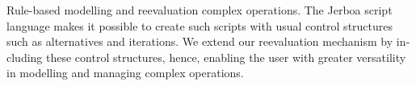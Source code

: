 \begin{otherlanguage}{english}
\begin{resume}{Rule-based modelling and reevaluation}
	  complex operations. The Jerboa script language makes it possible to create
	  such scripts with usual control structures such as alternatives and
	  iterations. We extend our reevaluation mechanism by including these
	  control structures, hence, enabling the user with greater versatility in
	  modelling and managing complex operations.
	\end{resume}
	\footnotesize{}
\end{otherlanguage}

